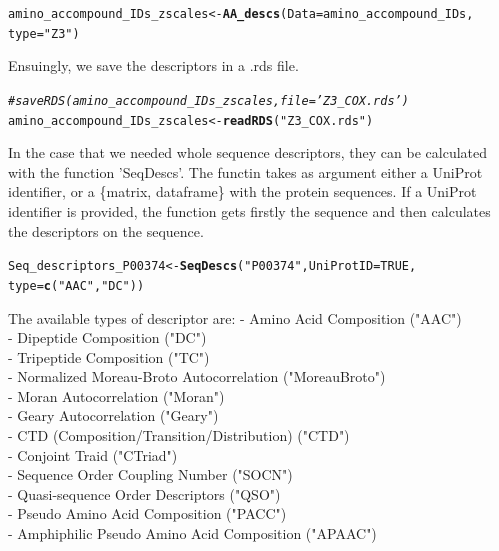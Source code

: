 \documentclass[twoside,a4wide,12pt]{article}\usepackage[]{graphicx}\usepackage[]{color}
\makeatletter
\newcommand{\hlnum}[1]{\textcolor[rgb]{0.686,0.059,0.569}{#1}}%
\newcommand{\hlstr}[1]{\textcolor[rgb]{0.192,0.494,0.8}{#1}}%
\newcommand{\hlcom}[1]{\textcolor[rgb]{0.678,0.584,0.686}{\textit{#1}}}%
\newcommand{\hlstd}[1]{\textcolor[rgb]{0.345,0.345,0.345}{#1}}%
\newcommand{\hlkwb}[1]{\textcolor[rgb]{0.69,0.353,0.396}{#1}}%
\newcommand{\hlkwc}[1]{\textcolor[rgb]{0.333,0.667,0.333}{#1}}%
\newcommand{\hlkwd}[1]{\textcolor[rgb]{0.737,0.353,0.396}{\textbf{#1}}}%
\newenvironment{kframe}{%
 \def\at@end@of@kframe{}%
 \ifinner\ifhmode%
  \def\at@end@of@kframe{\end{minipage}}%
  \begin{minipage}{\columnwidth}%
 \fi\fi%
 \def\FrameCommand##1{\hskip\@totalleftmargin \hskip-\fboxsep
 \colorbox{shadecolor}{##1}\hskip-\fboxsep
     \hskip-\linewidth \hskip-\@totalleftmargin \hskip\columnwidth}%
 \MakeFramed {\advance\hsize-\width
   \@totalleftmargin\z@ \linewidth\hsize
   \@setminipage}}%
 {\par\unskip\endMakeFramed%
 \at@end@of@kframe}
\newenvironment{knitrout}{}{} %
\makeatother
\begin{document}
\begin{knitrout}
\color{fgcolor}\begin{kframe}
\begin{alltt}
\hlstd{amino_accompound_IDs_zscales} \hlkwb{<-} \hlkwd{AA_descs}\hlstd{(}\hlkwc{Data} \hlstd{= amino_accompound_IDs,}
    \hlkwc{type} \hlstd{=} \hlstr{"Z3"}\hlstd{)}
\end{alltt}
\end{kframe}
\end{knitrout}


Ensuingly, we save the descriptors in a .rds file.
\begin{knitrout}
\color{fgcolor}\begin{kframe}
\begin{alltt}
\hlcom{# saveRDS(amino_accompound_IDs_zscales,file='Z3_COX.rds')}
\hlstd{amino_accompound_IDs_zscales} \hlkwb{<-} \hlkwd{readRDS}\hlstd{(}\hlstr{"Z3_COX.rds"}\hlstd{)}
\end{alltt}
\end{kframe}
\end{knitrout}


In the case that we needed whole sequence descriptors, they can be calculated with the function 'SeqDescs'. The functin takes as argument either a UniProt identifier, or a \{matrix, dataframe\} with the protein sequences. If a UniProt identifier is provided, the function gets firstly the sequence and then calculates the descriptors on the sequence.

\begin{knitrout}
\color{fgcolor}\begin{kframe}
\begin{alltt}
\hlstd{Seq_descriptors_P00374} \hlkwb{<-} \hlkwd{SeqDescs}\hlstd{(}\hlstr{"P00374"}\hlstd{,} \hlkwc{UniProtID} \hlstd{=} \hlnum{TRUE}\hlstd{,}
    \hlkwc{type} \hlstd{=} \hlkwd{c}\hlstd{(}\hlstr{"AAC"}\hlstd{,} \hlstr{"DC"}\hlstd{))}
\end{alltt}
\end{kframe}
\end{knitrout}

The available types of descriptor are:\cite{protr}
- Amino Acid Composition ("AAC")\\
- Dipeptide Composition ("DC")\\
- Tripeptide Composition ("TC")\\
- Normalized Moreau-Broto Autocorrelation ("MoreauBroto")\\
- Moran Autocorrelation ("Moran")\\
- Geary Autocorrelation ("Geary")\\
- CTD (Composition/Transition/Distribution) ("CTD")\\
- Conjoint Traid ("CTriad")\\
- Sequence Order Coupling Number ("SOCN")\\
- Quasi-sequence Order Descriptors ("QSO")\\
- Pseudo Amino Acid Composition ("PACC")\\
- Amphiphilic Pseudo Amino Acid Composition ("APAAC")\\
\end{document}
